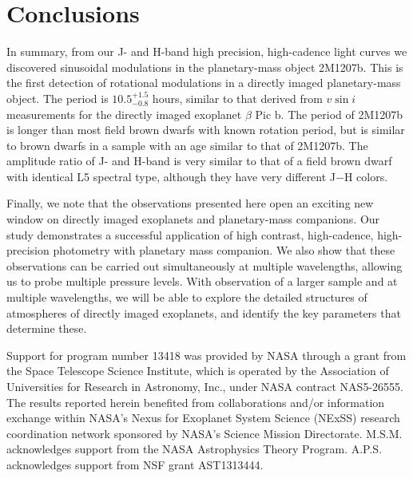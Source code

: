 \documentclass[apj]{emulateapj}
\newcommand{\bpic}{$\beta$ Pic}
\newcommand{\vsini}{$v\sin i$}
\newcommand{\revise}[1]{\textbf{{\color{cyan}{#1}}}}
\renewcommand{\revise}{}
\newcommand{\period}{$10.5^{+1.5}_{-0.8}$}
\begin{document}



\section{Conclusions}
In summary, from our J- and H-band high precision, high-cadence light
curves we discovered sinusoidal modulations in the planetary-mass
object 2M1207b. This is the first detection of rotational modulations
in a directly imaged planetary-mass object.  The period is
\period{} hours, similar to that derived from \vsini{} 
measurements for the directly imaged exoplanet \bpic{} b.
\revise{The period of 2M1207b is longer than most field brown dwarfs
  with known rotation period,  but is similar to brown dwarfs
in a sample with an age similar to that of 2M1207b.} The amplitude ratio of J- and H-band is very
similar to that of a field brown dwarf with identical L5 spectral type, although they have
very different J$-$H colors.

Finally, we note that the observations presented here open an exciting
new window on directly imaged exoplanets and planetary-mass
companions. Our study demonstrates a successful application of
high contrast, high-cadence, high-precision photometry with planetary
mass companion. We also show that these observations can be carried
out simultaneously at multiple wavelengths, allowing us to probe
multiple pressure levels. With observation of a larger sample and at
multiple wavelengths, we will be able to explore the detailed
structures of atmospheres of directly imaged exoplanets, and identify
the key parameters that determine these.

\acknowledgments

Support for program number 13418 was provided by NASA through a grant
from the Space Telescope Science Institute, which is operated by the
Association of Universities for Research in Astronomy, Inc., under
NASA contract NAS5-26555. The results reported herein benefited from
collaborations and/or information exchange within NASA's Nexus for
Exoplanet System Science (NExSS) research coordination network
sponsored by NASA's Science Mission Directorate. M.S.M. acknowledges
support from the NASA Astrophysics Theory Program. A.P.S. acknowledges
support from NSF grant AST1313444.

\end{document}

